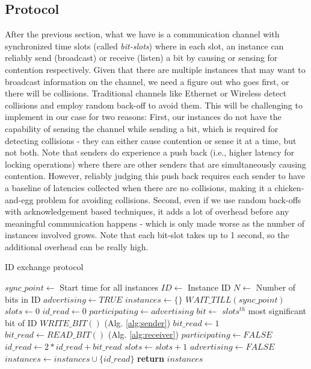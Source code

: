 \subsection{Protocol}
\label{sec:protocol}
After the previous section, what we have is a communication channel with
synchronized time slots (called \textit{bit-slots}) where in each slot, an
instance can reliably send (broadcast) or receive (listen) a bit by causing or
sensing for contention respectively. Given that there are multiple instances
that may want to broadcast information on the channel, we need a figure out who
goes first, or there will be collisions. Traditional channels like Ethernet or
Wireless detect collisions and employ random back-off to avoid them. This will
be challenging to implement in our case for two reasons: First, our instances do
not have the capability of sensing the channel while sending a bit, which is
required for detecting collisions - they can either cause contention or sense it
at a time, but not both. Note that senders do experience a push back (i.e.,
higher latency for locking operations) where there are other senders that are
simultaneously causing contention. However, reliably judging this push back
requires each sender to have a baseline of latencies collected when there are no
collisions, making it a chicken-and-egg problem for avoiding collisions.
Second, even if we use random back-offs with acknowledgement based techniques,
it adds a lot of overhead before any meaningful communication happens - which is
only made worse as the number of instances involved grows. Note that each
bit-slot takes up to 1 second, so the additional overhead can be really high.


\begin{algorithm}[!t]
\caption{ID exchange protocol }
\label{alg:protcol}
\begin{algorithmic}[1]
\STATE $sync\_point \leftarrow$ {Start time for all instances}
\STATE $ID \leftarrow$ {Instance ID}
\STATE $N \leftarrow$ {Number of bits in ID}
\STATE $advertising \leftarrow TRUE$
\STATE $instances \leftarrow \{\} $
\STATE $WAIT\_TILL(sync\_point)$
    \STATE $slots \leftarrow 0$
    \STATE $id\_read \leftarrow 0$
    \STATE $participating \leftarrow advertising$
        \STATE $bit \leftarrow$ {$slots^{th}$ most significant bit of ID}
            \STATE $WRITE\_BIT()$               (Alg. \ref{alg:sender})
            \STATE $bit\_read \leftarrow 1$
        \ELSE
            \STATE $bit\_read \leftarrow READ\_BIT()$       (Alg. \ref{alg:receiver})
                \STATE $participating \leftarrow FALSE$
            \ENDIF
        \ENDIF
        \STATE $id\_read \leftarrow 2 * id\_read + bit\_read$
        \STATE $slots \leftarrow slots + 1$
    \ENDWHILE
        \STATE $advertising \leftarrow FALSE$
    \ENDIF
    \STATE $instances \leftarrow instances \cup \{id\_read\}$
\ENDWHILE
\STATE \textbf{return} $instances$
\end{algorithmic}
\end{algorithm}

